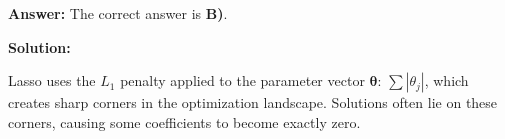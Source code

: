 \documentclass{article}
\newcommand{\vecb}[1]{\boldsymbol{#1}} %
\begin{document}
\begin{enumerate}
\textbf{Answer:} The correct answer is \textbf{B)}.

\textbf{Solution:}

Lasso uses the $L_1$ penalty applied to the parameter vector $\vecb{\theta}$: $\sum |\theta_j|$, which creates sharp corners in the optimization landscape.  
Solutions often lie on these corners, causing some coefficients to become exactly zero.

\vspace{6pt}
















\end{enumerate}
\end{document}
